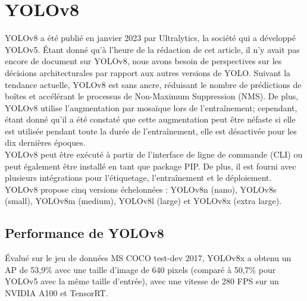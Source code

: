 \documentclass{article}
\begin{document}
\section{YOLOv8}
YOLOv8 \cite{100} a été publié en janvier 2023 par Ultralytics, la société qui a développé YOLOv5. Étant donné qu'à l'heure de la rédaction de cet article, il n'y avait pas encore de document sur YOLOv8, nous avons besoin de perspectives sur les décisions architecturales par rapport aux autres versions de YOLO. Suivant la tendance actuelle, YOLOv8 est sans ancre, réduisant le nombre de prédictions de boîtes et accélérant le processus de Non-Maximum Suppression (NMS). De plus, YOLOv8 utilise l'augmentation par mosaïque lors de l'entraînement; cependant, étant donné qu'il a été constaté que cette augmentation peut être néfaste si elle est utilisée pendant toute la durée de l'entraînement, elle est désactivée pour les dix dernières époques.
\vspace{.2cm}\\
YOLOv8 peut être exécuté à partir de l'interface de ligne de commande (CLI) ou peut également être installé en tant que package PIP. De plus, il est fourni avec plusieurs intégrations pour l'étiquetage, l'entraînement et le déploiement.
\vspace{.2cm}\\
YOLOv8 propose cinq versions échelonnées : YOLOv8n (nano), YOLOv8s (small), YOLOv8m (medium), YOLOv8l (large) et YOLOv8x (extra large).

\subsection{Performance de YOLOv8}

Évalué sur le jeu de données MS COCO test-dev 2017, YOLOv8x a obtenu un AP de 53,9\% avec une taille d'image de 640 pixels (comparé à 50,7\% pour YOLOv5 avec la même taille d'entrée), avec une vitesse de 280 FPS sur un NVIDIA A100 et TensorRT.
\end{document}
